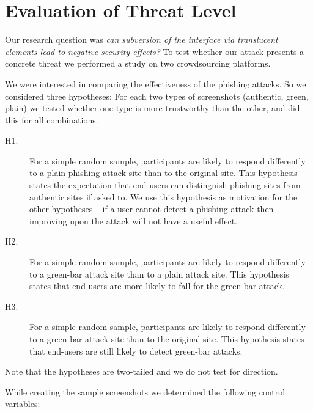 \documentclass[twoside,letterpaper]{soups}
\begin{document}
\section{Evaluation of Threat Level}\label{chap:evaluation}


Our research question was \emph{can subversion of the interface via translucent elements lead to negative security effects?} To test whether our attack presents a concrete threat we performed a study on two crowdsourcing platforms.

We were interested in comparing the effectiveness of the phishing attacks. So we considered three hypotheses: For each two types of screenshots (authentic, green, plain) we tested whether one type is more trustworthy than the other, and did this for all combinations.

\begin{description}
\item[H1.] For a simple random sample, participants are likely to respond differently to a plain phishing attack site than to the original site. This hypothesis states the expectation that end-users can distinguish phishing sites from authentic sites if asked to. We use this hypothesis as motivation for the other hypotheses -- if a user cannot detect a phishing attack then improving upon the attack will not have a useful effect.
\item[H2.] For a simple random sample, participants are likely to respond differently to a green-bar attack site than to a plain attack site. This hypothesis states that end-users are more likely to fall for the green-bar attack.
\item[H3.] For a simple random sample, participants are likely to respond differently to a green-bar attack site than to the original site. This hypothesis states that end-users are still likely to detect green-bar attacks.
\end{description}
\newcommand{\hypothesis}[1]{\textbf{H#1}}

Note that the hypotheses are two-tailed and we do not test for direction.


While creating the sample screenshots we determined the following control variables:
\end{document}
